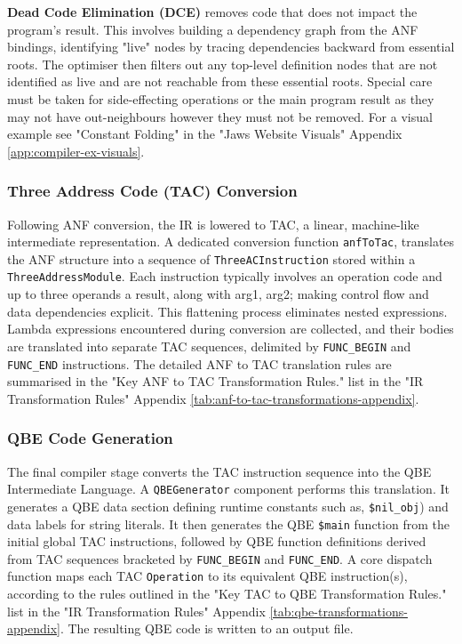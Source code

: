 \documentclass[final]{cmpreport_02}
\begin{document}
\textbf{Dead Code Elimination (DCE)} removes code that does not impact the program's result. This involves building a dependency graph from the ANF bindings, identifying "live" nodes by tracing dependencies backward from essential roots. The optimiser then filters out any top-level definition nodes that are not identified as live and are not reachable from these essential roots. Special care must be taken for side-effecting operations or the main program result as they may not have out-neighbours however they must not be removed. For a visual example see "Constant Folding" in the "Jaws Website Visuals" Appendix \ref{app:compiler-ex-visuals}.


\subsubsection{Three Address Code (TAC) Conversion}

Following ANF conversion, the IR is lowered to TAC, a linear, machine-like intermediate representation. A dedicated conversion function \texttt{anfToTac}, translates the ANF structure into a sequence of \texttt{ThreeACInstruction} stored within a \linebreak\texttt{ThreeAddressModule}. Each instruction typically involves an operation code and up to three operands a result, along with arg1, arg2; making control flow and data dependencies explicit. This flattening process eliminates nested expressions. Lambda expressions encountered during conversion are collected, and their bodies are translated into separate TAC sequences, delimited by \texttt{FUNC\_BEGIN} and \texttt{FUNC\_END} instructions. The detailed ANF to TAC translation rules are summarised in the "Key ANF to TAC Transformation Rules." list in the "IR Transformation Rules" Appendix \ref{tab:anf-to-tac-transformations-appendix}.

\subsubsection{QBE Code Generation}

The final compiler stage converts the TAC instruction sequence into the QBE Intermediate Language. A \texttt{QBEGenerator} component performs this translation. It generates a QBE data section defining runtime constants such as, \texttt{\$nil\_obj}) and data labels for string literals. It then generates the QBE \texttt{\$main} function from the initial global TAC instructions, followed by QBE function definitions derived from TAC sequences bracketed by \texttt{FUNC\_BEGIN} and \texttt{FUNC\_END}. A core dispatch function maps each TAC \texttt{Operation} to its equivalent QBE instruction(s), according to the rules outlined in the "Key TAC to QBE Transformation Rules." list in the "IR Transformation Rules" Appendix \ref{tab:qbe-transformations-appendix}. The resulting QBE code is written to an output file.
\end{document}
